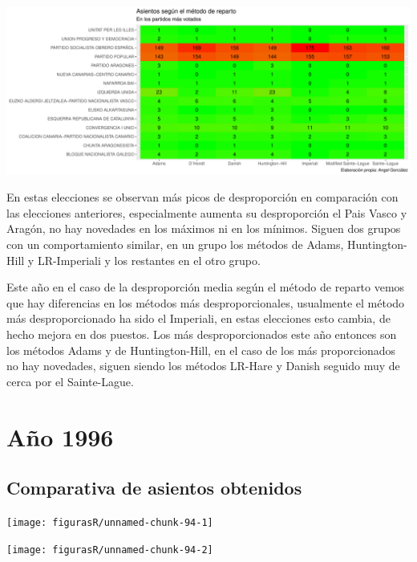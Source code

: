\documentclass[12pt,a4paper,]{book}
\numberwithin{dummy}{section}
\theoremstyle{ocrenumbox}
\theoremstyle{blacknumex}
\theoremstyle{blacknumbox}
\theoremstyle{ocrenum}
\theoremstyle{ocrenum}
\begin{document}
\begin{center}\includegraphics[width=1\linewidth]{figurasR/unnamed-chunk-92-2} \end{center}

En estas elecciones se observan más picos de desproporción en
comparación con las elecciones anteriores, especialmente aumenta su
desproporción el Pais Vasco y Aragón, no hay novedades en los máximos ni
en los mínimos. Siguen dos grupos con un comportamiento similar, en un
grupo los métodos de Adams, Huntington-Hill y LR-Imperiali y los
restantes en el otro grupo.

Este año en el caso de la desproporción media según el método de reparto
vemos que hay diferencias en los métodos más desproporcionales,
usualmente el método más desproporcionado ha sido el Imperiali, en estas
elecciones esto cambia, de hecho mejora en dos puestos. Los más
desproporcionados este año entonces son los métodos Adams y de
Huntington-Hill, en el caso de los más proporcionados no hay novedades,
siguen siendo los métodos LR-Hare y Danish seguido muy de cerca por el
Sainte-Lague.

\hypertarget{auxf1o-1996}{%
\section{Año 1996}\label{auxf1o-1996}}

\hypertarget{comparativa-de-asientos-obtenidos-6}{%
\subsection{Comparativa de asientos
obtenidos}\label{comparativa-de-asientos-obtenidos-6}}

\begin{center}\texttt{[image: figurasR/unnamed-chunk-94-1]} \end{center}

\begin{center}\texttt{[image: figurasR/unnamed-chunk-94-2]} \end{center}
\end{document}
